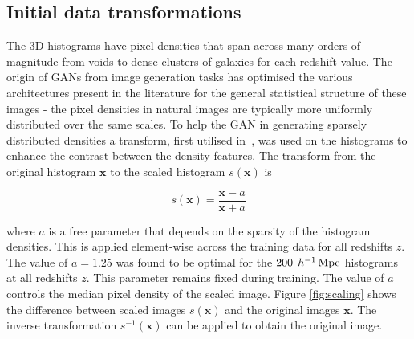 \documentclass[twocolumn]{article}
\numberwithin{equation}{section}
\begin{document}


\subsection{Initial data transformations} 
The 3D-histograms have pixel densities that span across many orders of magnitude from voids to dense clusters of galaxies 
for each redshift value. The origin of GANs from image generation tasks has optimised the various architectures present in 
the literature for the general statistical structure of these images - the pixel densities in natural images are typically 
more uniformly distributed over the same scales. To help the GAN in generating sparsely distributed densities a transform, 
first utilised in~\cite{web_gan}, was used on the histograms to enhance the contrast between the density features. The 
transform from the original histogram $\mathbf{x}$ to the scaled histogram $s(\mathbf{x})$ is 

\begin{equation}
    s(\mathbf{x}) = \frac{\mathbf{x} - a}{\mathbf{x} + a}
\end{equation}

where $a$ is a free parameter that depends on the sparsity of the histogram densities. This is applied element-wise across 
the training data for all redshifts $z$. The value of $a=1.25$ was found to be optimal for the 
$200 \:  \: h^{-1} \,\textup{Mpc}$ histograms at all redshifts $z$. This parameter remains fixed during training. The value 
of $a$ controls the median pixel density of the scaled image. Figure \ref{fig:scaling} shows the difference between scaled 
images $s(\mathbf{x})$ and the original images $\mathbf{x}$. The inverse transformation $s^{-1}(\mathbf{x})$ can be applied 
to obtain the original image. 

\end{document}
